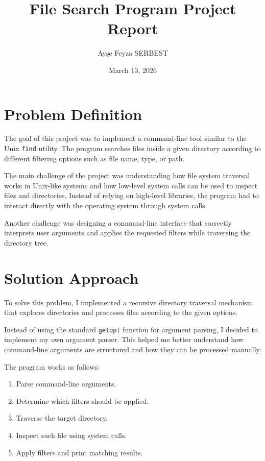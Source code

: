 \documentclass[12pt]{article}
\title{File Search Program Project Report}
\author{Ayşe Feyza SERBEST}
\date{March 13, 2026}
\begin{document}
\maketitle

\section{Problem Definition}

The goal of this project was to implement a command-line tool similar to the Unix \texttt{find} utility. The program searches files inside a given directory according to different filtering options such as file name, type, or path.

The main challenge of the project was understanding how file system traversal works in Unix-like systems and how low-level system calls can be used to inspect files and directories. Instead of relying on high-level libraries, the program had to interact directly with the operating system through system calls.

Another challenge was designing a command-line interface that correctly interprets user arguments and applies the requested filters while traversing the directory tree.

\section{Solution Approach}

To solve this problem, I implemented a recursive directory traversal mechanism that explores directories and processes files according to the given options.

Instead of using the standard \texttt{getopt} function for argument parsing, I decided to implement my own argument parser. This helped me better understand how command-line arguments are structured and how they can be processed manually.

The program works as follows:

\begin{enumerate}
\item Parse command-line arguments.
\item Determine which filters should be applied.
\item Traverse the target directory.
\item Inspect each file using system calls.
\item Apply filters and print matching results.
\end{enumerate}
\end{document}
